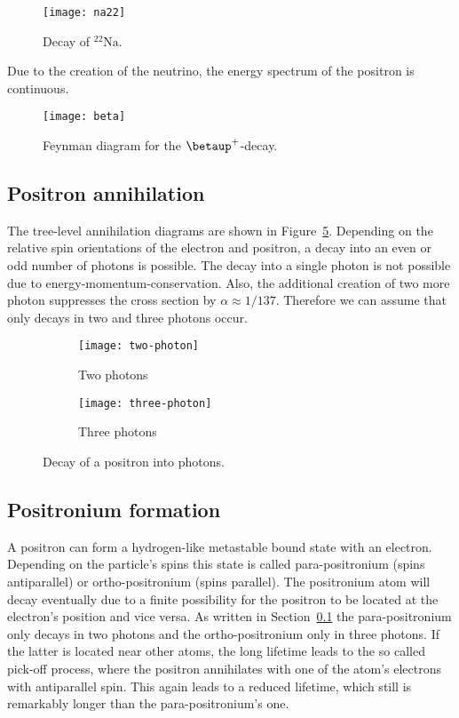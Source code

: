 \documentclass[11pt, english, fleqn, DIV=15, headinclude, BCOR=2cm]{scrreprt}
\begin{document}
\begin{figure}
    \centering
    \texttt{[image: na22]}
    \caption{%
        Decay of $\mathrm{^{22}Na}$.
    }
    \label{fig:na22}
\end{figure}

Due to the creation of the neutrino, the energy spectrum of the positron is
continuous.

\begin{figure}
    \centering
    \texttt{[image: beta]}
    \caption{%
        Feynman diagram for the $\betaup^+$-decay.
    }
    \label{fig:beta}
\end{figure}

\subsection{Positron annihilation}
\label{ssec:pos_ann}

The tree-level annihilation diagrams are shown in
Figure~\ref{fig:annihilation}. Depending on the relative spin orientations of
the electron and positron, a decay into an even or odd number of photons is
possible. The decay into a single photon is not possible due to
energy-momentum-conservation. Also, the additional creation of two more photon
suppresses the cross section by $\alpha \approx 1/137$. Therefore we can assume
that only decays in two and three photons occur.

\begin{figure}
    \centering
    \begin{subfigure}[c]{0.48\linewidth}
        \centering
        \texttt{[image: two-photon]}
        \caption{%
            Two photons
        }
        \label{fig:/1}
    \end{subfigure}
    \hfill
    \begin{subfigure}[c]{0.48\linewidth}
        \centering
        \texttt{[image: three-photon]}
        \caption{%
            Three photons
        }
        \label{fig:/2}
    \end{subfigure}
    \caption{%
        Decay of a positron into photons.
    }
    \label{fig:annihilation}
\end{figure}

\subsection{Positronium formation}

A positron can form a hydrogen-like metastable bound state with an electron.
Depending on the particle's spins this state is called para-positronium (spins
antiparallel) or ortho-positronium (spins parallel). The positronium atom will
decay eventually due to a finite possibility for the positron to be located at
the electron's position and vice versa. As written in
Section~\ref{ssec:pos_ann} the para-positronium only decays in two photons and
the ortho-positronium only in three photons. If the latter is located near
other atoms, the long lifetime leads to the so called pick-off process, where
the positron annihilates with one of the atom's electrons with antiparallel
spin. This again leads to a reduced lifetime, which still is remarkably longer
than the para-positronium's one.
\end{document}
